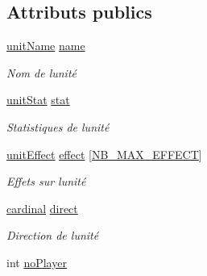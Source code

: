 \subsection*{Attributs publics}
\begin{DoxyCompactItemize}
\item 
\hypertarget{structunit_aad8b083b6438d26e8aade384522e867c}{}\hyperlink{engine_8h_af7667555c2dcfbdd55ec3e9dd6a907ba}{unit\+Name} \hyperlink{structunit_aad8b083b6438d26e8aade384522e867c}{name}\label{structunit_aad8b083b6438d26e8aade384522e867c}

\begin{DoxyCompactList}\small\item\em Nom de l\textquotesingle{}unité \end{DoxyCompactList}\item 
\hypertarget{structunit_a88d6da278053824260f4f4987773b34f}{}\hyperlink{structunitStat}{unit\+Stat} \hyperlink{structunit_a88d6da278053824260f4f4987773b34f}{stat}\label{structunit_a88d6da278053824260f4f4987773b34f}

\begin{DoxyCompactList}\small\item\em Statistiques de l\textquotesingle{}unité \end{DoxyCompactList}\item 
\hypertarget{structunit_ab65f3e50337d201c634aa46587ea32ff}{}\hyperlink{engine_8h_ac5ece9b6993cd3565502866b56317e84}{unit\+Effect} \hyperlink{structunit_ab65f3e50337d201c634aa46587ea32ff}{effect} \mbox{[}\hyperlink{engine_8h_a21db47461d910a7cad180b5532f1a7f8}{N\+B\+\_\+\+M\+A\+X\+\_\+\+E\+F\+F\+E\+C\+T}\mbox{]}\label{structunit_ab65f3e50337d201c634aa46587ea32ff}

\begin{DoxyCompactList}\small\item\em Effets sur l\textquotesingle{}unité \end{DoxyCompactList}\item 
\hypertarget{structunit_a249f61ef45de3f8ca00b181374f2f051}{}\hyperlink{engine_8h_a468af3d7606639780e81c5e1e403b356}{cardinal} \hyperlink{structunit_a249f61ef45de3f8ca00b181374f2f051}{direct}\label{structunit_a249f61ef45de3f8ca00b181374f2f051}

\begin{DoxyCompactList}\small\item\em Direction de l\textquotesingle{}unité \end{DoxyCompactList}\item 
\hypertarget{structunit_a885e1b4b75d53199f4b03bdbd442cd37}{}int \hyperlink{structunit_a885e1b4b75d53199f4b03bdbd442cd37}{no\+Player}\label{structunit_a885e1b4b75d53199f4b03bdbd442cd37}


\end{DoxyCompactItemize}
